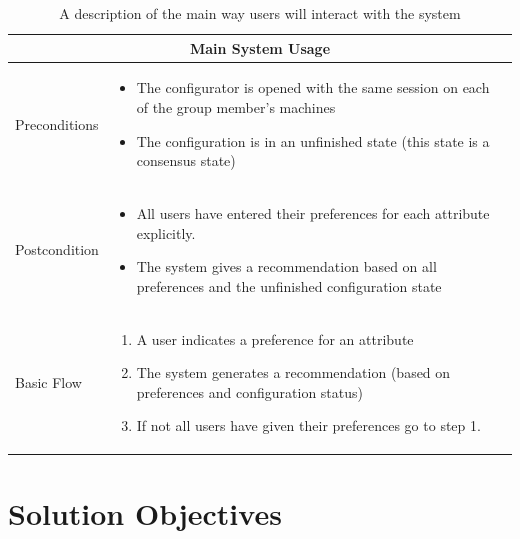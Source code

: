 \begin{table}
    \begin{center}
        \begin{tabularx}{\columnwidth}{l|X}
            \multicolumn{2}{c}{Main System Usage} \\
            \hline
            Preconditions   & 
                \begin{itemize}
                    \item The configurator is opened with the same session on each of the group member's machines
                    \item The configuration is in an unfinished state (this state is a consensus state)
                \end{itemize} \\
            \hline
            Postcondition   & 
                \begin{itemize}
                    \item All users have entered their preferences for each attribute explicitly.
                    \item The system gives a recommendation based on all preferences and the unfinished configuration state
                \end{itemize} \\
            \hline
            Basic Flow      & 
                \begin{enumerate}
                    \item A user indicates a preference for an attribute
                    \item The system generates a recommendation (based on preferences and configuration status)
                    \item If not all users have given their preferences go to step 1.
                \end{enumerate} \\
            \hline
        \end{tabularx}
        \caption{A description of the main way users will interact with the system}
        \label{tab:MainUseCase}
    \end{center}
\end{table}

\FloatBarrier

\section{Solution Objectives}

